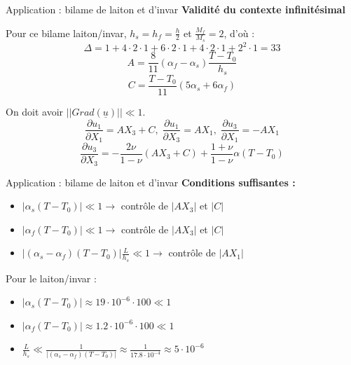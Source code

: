 \begin{frame}{Application : bilame de laiton et d'invar}
    \textbf{\Large{Validité du contexte infinitésimal}}
    
    Pour ce bilame laiton/invar, $h_s = h_f = \frac{h}{2}$ et $\frac{M_f}{M_s} = 2$, d'où :
    $$\Delta = 1+4\cdot2\cdot1+6\cdot2\cdot1+4\cdot2\cdot1+2^{2}\cdot1 = 33$$
    $$A = \frac{8}{11}(\alpha_f-\alpha_s)\frac{T-T_0}{h_s}$$
    $$C = \frac{T-T_0}{11}(5\alpha_s+6\alpha_f)$$
    
    On doit avoir $||Grad(\underline{u})|| \ll 1$.
    $$\frac{\partial u_1}{\partial X_1} = A X_3+C,\; \frac{\partial u_1}{\partial X_3} = A X_1,\; \frac{\partial u_3}{\partial X_1} = -A X_1$$
    $$\frac{\partial u_3}{\partial X_3} = -\frac{2\nu}{1-\nu}(A X_3 + C) + \frac{1+\nu}{1-\nu}\alpha(T-T_0)$$
\end{frame}

\begin{frame}{Application : bilame de laiton et d'invar}
    \textbf{Conditions suffisantes :}
    \begin{itemize}
        \item $|\alpha_s(T-T_0)|\ll 1 \rightarrow$ contrôle de $|A X_3|$ et $|C|$
        \item $|\alpha_f(T-T_0)|\ll 1 \rightarrow$ contrôle de $|A X_3|$ et $|C|$
        \item $|(\alpha_s-\alpha_f)(T-T_0)|\frac{L}{h_s}\ll 1 \rightarrow$ contrôle de $|A X_1|$
    \end{itemize}
    Pour le laiton/invar :
    \begin{itemize}
        \item $|\alpha_s(T-T_0)|\approx19\cdot10^{-6}\cdot100\ll1$
        \item $|\alpha_f(T-T_0)|\approx1.2\cdot10^{-6}\cdot100\ll1$
        \item $\frac{L}{h_s}\ll \frac{1}{|(\alpha_s-\alpha_f)(T-T_0)|} \approx \frac{1}{17.8\cdot 10^{-4}}\approx 5\cdot 10^{-6}$
    \end{itemize}
\end{frame}

